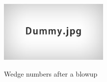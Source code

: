 \begin{figure}
	\centering
	\captionsetup{justification=centering}
	\caption{Wedge numbers after a blowup}
	\includegraphics[height=3cm]{figures/dummy.jpg}
	\label{fig:wedgenumblowup}
\end{figure}